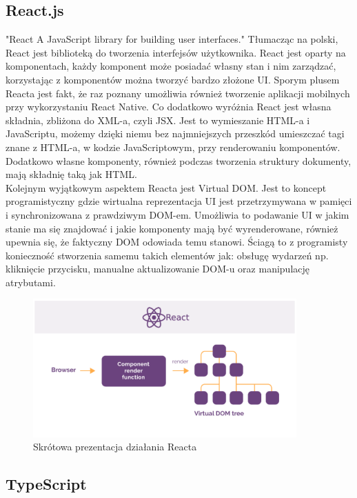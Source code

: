 \documentclass[12pt]{article}
\begin{document}
\begin{sloppypar}
{\subsection{React.js}
{
  "React A JavaScript library for building user interfaces."\cite{react} Tłumacząc na polski, React jest biblioteką do tworzenia interfejsów użytkownika. 
  React jest oparty na komponentach, każdy komponent może posiadać własny stan i nim zarządzać, korzystając z komponentów można tworzyć bardzo złożone UI. 
  Sporym plusem Reacta jest fakt, że raz poznany umożliwia również tworzenie aplikacji mobilnych przy wykorzystaniu React Native. Co dodatkowo wyróżnia React 
  jest własna składnia, zbliżona do XML-a, czyli JSX. Jest to wymieszanie HTML-a i JavaScriptu, możemy dzięki niemu bez najmniejszych przeszkód umieszczać 
  tagi znane z HTML-a, w kodzie JavaScriptowym, przy renderowaniu komponentów. Dodatkowo własne komponenty, również podczas tworzenia struktury dokumenty, mają 
  składnię taką jak HTML. \\
  Kolejnym wyjątkowym aspektem Reacta jest Virtual DOM. Jest to koncept programistyczny gdzie wirtualna reprezentacja UI jest przetrzymywana w pamięci i synchronizowana 
  z prawdziwym DOM-em. Umożliwia to podawanie UI w jakim stanie ma się znajdować i jakie komponenty mają być wyrenderowane, również upewnia się, że faktyczny DOM odowiada temu stanowi. 
  Ściagą to z programisty konieczność stworzenia samemu takich elementów jak: obsługę wydarzeń np. kliknięcie przycisku, manualne aktualizowanie DOM-u oraz manipulację atrybutami.
  \begin{figure}[H]
    \centering
    \includegraphics[width=0.9\textwidth]{how_react_works.PNG}
    \caption{Skrótowa prezentacja działania Reacta}
    \label{fig:how-react-works}
  \end{figure}
  
}
\subsection{TypeScript}
{

}}
\end{sloppypar}
\end{document}
